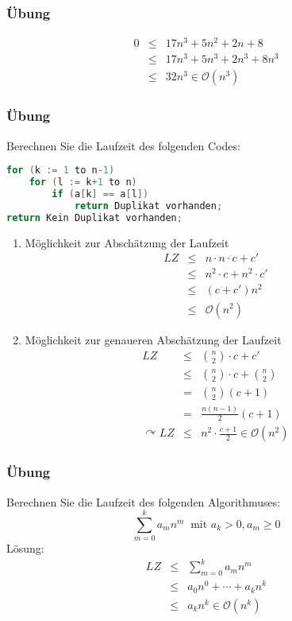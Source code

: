 \subsubsection{Übung}
\begin{eqnarray*}
	0	&\leq& 17n^3 + 5n^2 + 2n + 8 \\
		&\leq& 17n^3 + 5n^3 + 2n^3 + 8n^3 \\
		&\leq& 32n^3 \in \mathcal{O}(n^3)
\end{eqnarray*}

\subsubsection{Übung}
Berechnen Sie die Laufzeit des folgenden Codes:
\begin{lstlisting}[language=java, caption={Pseudocode zur Berechnung der Laufzeit}]
for (k := 1 to n-1)
	for (l := k+1 to n)
		if (a[k] == a[l])
			return Duplikat vorhanden;
return Kein Duplikat vorhanden;
\end{lstlisting}
\begin{enumerate}
	\item Möglichkeit zur Abschätzung der Laufzeit
		\begin{eqnarray*}
		LZ 	&\leq& n \cdot n \cdot c + c'	\\
			&\leq& n^2 \cdot c + n^2 \cdot c'	\\
			&\leq& (c+c') n^2				\\
			&\leq& \mathcal{O}(n^{2})
		\end{eqnarray*}
	\item Möglichkeit zur genaueren Abschätzung der Laufzeit
	\begin{eqnarray*}
		LZ	&\leq& \binom{n}{2} \cdot c + c' \\
			&\leq& \binom{n}{2} \cdot c + \binom{n}{2} \\
			&=& \binom{n}{2}(c+1)	\\
			&=& \frac{n(n-1)}{2}(c+1)	\\
	\curvearrowright LZ &\leq& n^{2} \cdot \frac{c+1}{2} \in \mathcal{O}(n^{2})
	\end{eqnarray*}
\end{enumerate}

\subsubsection{Übung}
Berechnen Sie die Laufzeit des folgenden Algorithmuses:
\[\sum_{m=0}^{k} a_m n^m \;\;\textrm{mit } a_k > 0, a_m \geq 0\]
Lösung:
\begin{eqnarray*}
	LZ	&\leq& \sum_{m=0}^{k} a_m n^m \\
		&\leq& a_0 n^0 + \cdots + a_k n^k \\
		&\leq& a_k n^k \in \mathcal{O}(n^k)
\end{eqnarray*}




